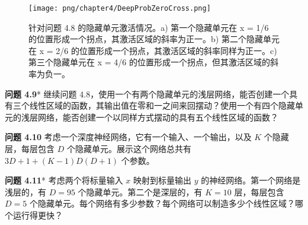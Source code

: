\begin{figure}[ht!]
	\centering
	\texttt{[image: png/chapter4/DeepProbZeroCross.png]}
	\caption{针对问题 4.8 的隐藏单元激活情况。a) 第一个隐藏单元在 x = 1/6 的位置形成一个拐点，其激活区域的斜率为正一。b) 第二个隐藏单元在 x = 2/6 的位置形成一个拐点，其激活区域的斜率同样为正一。c) 第三个隐藏单元在 x = 4/6 的位置形成一个拐点，但其激活区域的斜率为负一。}
\end{figure}


\textbf{问题 4.9}* 继续问题 4.8，使用一个有两个隐藏单元的浅层网络，能否创建一个具有三个线性区域的函数，其输出值在零和一之间来回摆动？使用一个有四个隐藏单元的浅层网络，能否创建一个以同样方式摆动的具有五个线性区域的函数？

\textbf{问题 4.10} 考虑一个深度神经网络，它有一个输入、一个输出，以及 \(K\) 个隐藏层，每层包含 \(D\) 个隐藏单元。展示这个网络总共有 \(3D + 1 + (K - 1)D(D + 1)\) 个参数。

\textbf{问题 4.11}* 考虑两个将标量输入 \(x\) 映射到标量输出 \(y\) 的神经网络。第一个网络是浅层的，有 \(D = 95\) 个隐藏单元。第二个是深层的，有 \(K = 10\) 层，每层包含 \(D = 5\) 个隐藏单元。每个网络有多少参数？每个网络可以制造多少个线性区域？哪个运行得更快？


